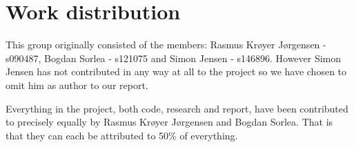\documentclass[12pt]{article}
\begin{document}
\maketitle


\section{Work distribution}
This group originally consisted of the members: Rasmus Kr{\o}yer J{\o}rgensen - s090487, Bogdan Sorlea - s121075 and Simon Jensen - s146896. However Simon Jensen has not contributed in any way at all to the project so we have chosen to omit him as author to our report.

Everything in the project, both code, research and report, have been contributed to precisely equally by Rasmus Kr{\o}yer J{\o}rgensen and Bogdan Sorlea. That is that they can each be attributed to 50\% of everything.
\end{document}
